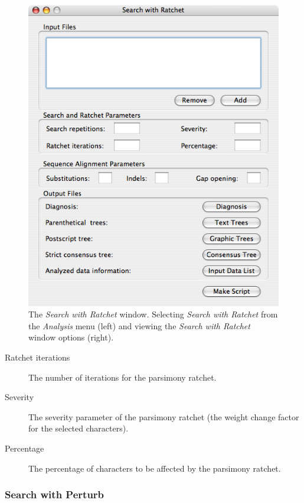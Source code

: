 \begin{figure}
\begin{minipage}[c]{0.48\textwidth}
	   	\includegraphics[width=\textwidth]{figures/SearchWithRatchet_Window.jpg}
   	\end{minipage}
	
\caption{The \emph{Search with Ratchet} window. Selecting \emph{Search with Ratchet} from the \emph{Analysis} menu (left) and viewing the \emph{Search with Ratchet} window options (right).}
\label{fig:search_with_ratchet_window}
\end{figure}

\begin{description}
    \item[Ratchet iterations] The number of iterations for the parsimony
        ratchet.
    \item[Severity] The severity parameter of the parsimony ratchet (the weight
        change factor for the selected characters).
    \item[Percentage] The percentage of characters to be affected by the
        parsimony ratchet.
\end{description}

\subsubsection{Search with Perturb}

